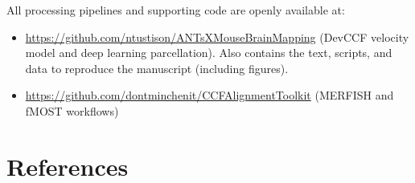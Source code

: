 \documentclass[
  12pt,
]{article}
\providecommand{\tightlist}{%
  \setlength{\itemsep}{0pt}\setlength{\parskip}{0pt}}
\begin{document}
All processing pipelines and supporting code are openly available at:

\begin{itemize}
\tightlist
\item
  \url{https://github.com/ntustison/ANTsXMouseBrainMapping} (DevCCF
  velocity model and deep learning parcellation). Also contains the
  text, scripts, and data to reproduce the manuscript (including
  figures).
\item
  \url{https://github.com/dontminchenit/CCFAlignmentToolkit} (MERFISH
  and fMOST workflows)
\end{itemize}

\clearpage

\section*{References}\label{references}
\end{document}
